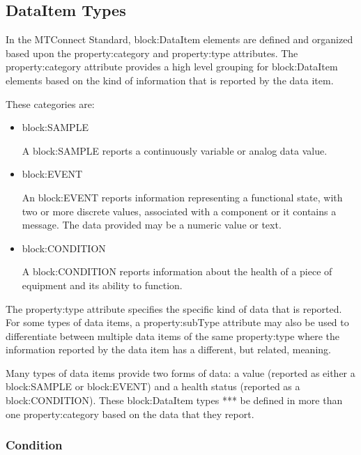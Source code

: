 \subsection{DataItem Types} \label{sec:DataItemTypes}

In the MTConnect Standard, {block:DataItem} elements are defined and organized based upon the {property:category} and {property:type} attributes.  The {property:category} attribute provides a high level grouping for {block:DataItem} elements based on the kind of information that is reported by the data item.

These categories are:

\begin{itemize}

\item {block:SAMPLE}

A {block:SAMPLE} reports a continuously variable or analog data value. 

\item {block:EVENT}

An {block:EVENT} reports information representing a functional state, with two or more discrete values, associated with a component or it contains a message.  The data provided may be a numeric value or text.

\item {block:CONDITION}

A {block:CONDITION} reports information about the health of a piece of equipment and its ability to function.
\end{itemize}

The {property:type} attribute specifies the specific kind of data that is reported.   For some types of data items, a {property:subType} attribute may also be used to differentiate between multiple data items of the same {property:type} where the information reported by the data item has a different, but related, meaning.

Many types of data items provide two forms of data: a value (reported as either a {block:SAMPLE} or {block:EVENT}) and a health status (reported as a {block:CONDITION}).  These {block:DataItem} types **\may** be defined in more than one {property:category} based on the data that they report.



\subsubsection{Condition}
  \label{sec:Condition}


